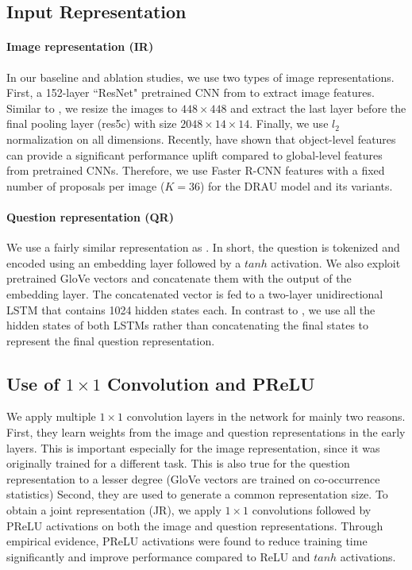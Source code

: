 \documentclass[times,twocolumn, final ,authoryear]{elsarticle}
\begin{document}
  
\subsection{Input Representation}\label{sub:input}
\paragraph{Image representation (IR)} In our baseline and ablation studies, we use two types of image representations. First, a 152-layer ``ResNet" pretrained CNN from \citet{he2015} to extract image features. Similar to \citep{fukui2016, nam2016b}, we resize the images to $448\times 448$ and extract the last layer before the final pooling layer (res5c) with size $2048\times14\times14$. Finally, we use $l_2$ normalization  on all dimensions.
	Recently, \citet{anderson2017} have shown that object-level features can provide a significant performance uplift compared to global-level features from pretrained CNNs. Therefore, we use Faster R-CNN features \citep{ren2015b} with a fixed number of proposals per image ($K = 36$) for the DRAU model and its variants.
\paragraph{Question representation (QR)}
We use a fairly similar representation as \cite{fukui2016}. In short, the question is tokenized and encoded using an embedding layer followed by a $tanh$ activation. We also exploit pretrained GloVe vectors \citep{pennington2014glove} and concatenate them with the output of the embedding layer. The concatenated vector is fed to a two-layer unidirectional LSTM that contains 1024 hidden states each. In contrast to \citeauthor{fukui2016}, we use all the hidden states of both LSTMs rather than concatenating the final states to represent the final question representation.

\subsection{Use of $1\times1$ Convolution and PReLU}
We apply multiple $1\times1$ convolution layers in the network for mainly two reasons. First, they learn weights from the image and question representations in the early layers. This is important especially for the image representation, since it was originally trained for a different task. This is also true for the question representation to a lesser degree (GloVe vectors are trained on co-occurrence statistics) Second, they are used to generate a common representation size. To obtain a joint representation (JR), we apply $1\times1$ convolutions followed by PReLU activations on both the image and question representations. Through empirical evidence, PReLU activations were found to reduce training time significantly and improve performance compared to ReLU and $tanh$ activations. 
\end{document}

